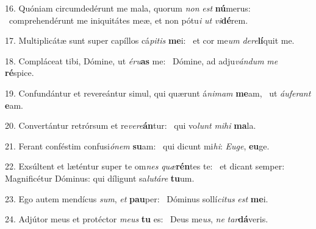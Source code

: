 16. Quóniam circumdedérunt me mala, quorum \textit{non} \textit{est} \textbf{nú}merus: \ast\  comprehendérunt me iniquitátes meæ, et non pótu\textit{i} \textit{ut} \textit{vi}\textbf{dé}rem.\

17. Multiplicátæ sunt super capíllos cá\textit{pi}\textit{tis} \textbf{me}i: \ast\  et cor me\textit{um} \textit{de}\textit{re}\textbf{lí}quit me.\

18. Compláceat tibi, Dómine, ut \textit{é}\textit{ru}\textbf{as} me: \ast\  Dómine, ad adju\textit{ván}\textit{dum} \textit{me} \textbf{ré}spice.\

19. Confundántur et revereántur simul, qui quærunt á\textit{ni}\textit{mam} \textbf{me}am, \ast\  ut \textit{áu}\textit{fe}\textit{rant} \textbf{e}am.\

20. Convertántur retrórsum et re\textit{ve}\textit{re}\textbf{án}tur: \ast\  qui vo\textit{lunt} \textit{mi}\textit{hi} \textbf{ma}la.\

21. Ferant conféstim confusi\textit{ó}\textit{nem} \textbf{su}am: \ast\  qui dicunt mi\textit{hi}: \textit{Eu}\textit{ge}, \textbf{eu}ge.\

22. Exsúltent et læténtur super te om\textit{nes} \textit{quæ}\textbf{rén}tes te: \ast\  et dicant semper: Magnificétur Dóminus: qui díligunt sa\textit{lu}\textit{tá}\textit{re} \textbf{tu}um.\

23. Ego autem mendícus \textit{sum}, \textit{et} \textbf{pau}per: \ast\  Dóminus sollí\textit{ci}\textit{tus} \textit{est} \textbf{me}i.\

24. Adjútor meus et protéctor \textit{me}\textit{us} \textbf{tu} es: \ast\  Deus me\textit{us}, \textit{ne} \textit{tar}\textbf{dá}veris.\

